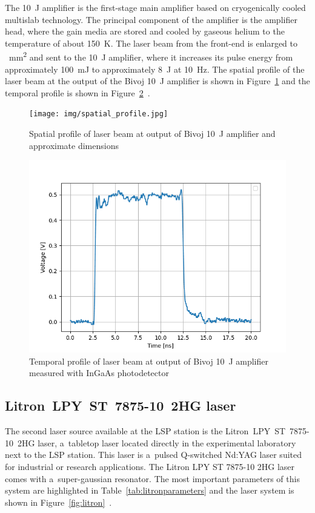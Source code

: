 The \SI{10}{\joule}  amplifier is the first-stage main amplifier based on
cryogenically cooled multislab technology. The principal
component of the amplifier is the amplifier head, where the
gain media are stored and cooled by gaseous helium to 
the temperature of about \SI{150}{\kelvin}. The laser beam from the front-end
is enlarged to  \SI{}{\mm\squared} and sent to the \SI{10}{\joule} amplifier, where it
increases its pulse energy from approximately \SI{100}{\milli\joule} to
approximately \SI{8}{\joule} at \SI{10}{\hertz}. The spatial profile of the laser beam at the output of the Bivoj \SI{10}{\joule} amplifier is shown in Figure~\ref{fig:spatialprofile} and the temporal profile is shown in Figure~\ref{fig:temporalprofile}~\cite{saumyabrata}.

\begin{figure}[h]
    \centering
    \texttt{[image: img/spatial\_profile.jpg]}
    \caption[Spatial profile of laser beam at output of Bivoj \SI{10}{\joule} amplifier]{Spatial profile of laser beam at output of Bivoj \SI{10}{\joule} amplifier and approximate dimensions \protect\cite{kaufman}}
    \label{fig:spatialprofile}
\end{figure}

\begin{figure}[h]
    \centering
    \includegraphics[width=0.52\linewidth]{img/temporal_profile_bivoj_v_2.png}
    \caption[Temporal profile of laser beam at output of Bivoj \SI{10}{\joule}]{Temporal profile of laser beam at output of Bivoj \SI{10}{\joule} amplifier measured with InGaAs photodetector \protect\cite{kaufman}}
    \label{fig:temporalprofile}
\end{figure}

\subsection{Litron~LPY~ST~7875-10~2HG laser}

The second laser source available at the LSP station is the Litron~LPY~ST~7875-10~2HG laser, a~tabletop laser located directly in the experimental laboratory next to the LSP station. This laser is a~pulsed Q-switched Nd:YAG laser suited for industrial or research applications. The Litron  LPY ST 7875-10 2HG laser comes with a~super-gaussian resonator. The most important parameters of this system are highlighted in Table~\ref{tab:litronparameters} and the laser system is shown in Figure~\ref{fig:litron}~\cite{litron}. 


